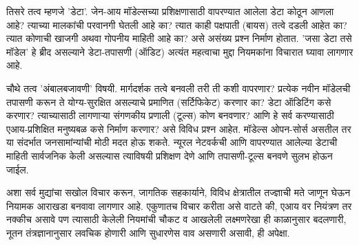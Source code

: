 तिसरे तत्व म्हणजे 'डेटा'. जेन-आय मॉडेल्सच्या प्रशिक्षणासाठी वापरण्यात आलेला डेटा कोठून आणला आहे? त्याच्या मालकांची परवानगी घेतली आहे का? त्यात काही पक्षपाती (बायस) तत्वे दडली आहेत का? त्यात कोणाची खाजगी अथवा गोपनीय माहिती आहे का? असे असंख्य प्रश्न निर्माण होतात. 'जसा डेटा तसे मॉडेल' हे ब्रीद असल्याने डेटा-तपासणी (ऑडिट) अत्यंत महत्वाचा मुद्दा नियमकांना विचारात घ्यावा लागणार आहे.

चौथे तत्व 'अंबालबजावणी' विषयी. मार्गदर्शक तत्वे बनवली तरी ती कशी वापरणार? प्रत्येक नवीन मॉडेलची तपासणी करून ते योग्य-सुरक्षित असल्याचे प्रमाणित (सर्टिफिकेट) करणार का? डेटा ऑडिटिंग कसे करणार? त्याच्यासाठी लागणाऱ्या संगणकीय प्रणाली (टूल्स) कोण बनवणार? आणि हे सर्व करण्यासाठी एआय-प्रशिक्षित मनुष्यबळ कसे निर्माण करणार? असे विविध प्रश्न आहेत. मॉडेल्स ओपन-सोर्स असतील तर या संदर्भात जनसामांन्यांची मोठी मदत होऊ शकते. न्यूरल नेटवर्कची आणि वापरण्यात आलेल्या डेटाची माहिती सार्वजनिक केली असल्यास त्याविषयी प्रशिक्षण देणे आणि तपासणी-टूल्स बनवणे सुलभ होऊन जाईल.

अशा सर्व मुद्यांचा सखोल विचार करून, जागतिक सहकार्याने, विविध क्षेत्रातील तज्ज्ञाची मते जाणून घेऊन नियामक आराखडा बनवावा लागणार आहे. एकुणातच विचार करीता असे वाटते की, एआय वर नियंत्रण तर नक्कीच असावे पण त्यासाठी केलेली नियमांची चौकट व आखलेली लक्ष्मणरेखा ही काळानुसार बदलणारी, नूतन तंत्रज्ञानानुसार लवचिक होणारी आणि सुधारणेस वाव असणारी असावी, ही अपेक्षा.